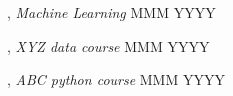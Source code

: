 , 
\textit{Machine Learning} 
\hfill MMM YYYY

, 
\textit{XYZ data course} 
\hfill MMM YYYY

, 
\textit{ABC python course} 
\hfill MMM YYYY
